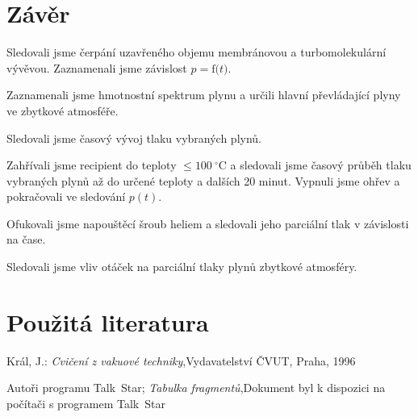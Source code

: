 \documentclass[english]{article}
\newcommand{\unit}[1]{~\mathrm{#1}}
\newcommand{\degc}{^\circ C}
\begin{document}
\section{Závěr}
	Sledovali jsme čerpání uzavřeného objemu membránovou a turbomolekulární vývěvou. Zaznamenali jsme závislost $p = \mathrm{f(}t\mathrm{)}$. 
	
	Zaznamenali jsme hmotnostní spektrum plynu a určili hlavní převládající plyny ve zbytkové atmosféře.
	
	Sledovali jsme časový vývoj tlaku vybraných plynů.
	
	Zahřívali jsme recipient do teploty $\leq 100\unit{\degc}$ a sledovali jsme časový průběh tlaku vybraných plynů až do určené teploty a dalších 20 minut. Vypnuli jsme ohřev a pokračovali ve sledování $p(t)$.
	
	Ofukovali jsme napouštěcí šroub heliem a sledovali jeho parciální tlak v závislosti na čase.
	
	Sledovali jsme vliv otáček na parciální tlaky plynů zbytkové atmosféry.
	
	
\section {Použitá literatura}
\begingroup
\renewcommand{\section}[2]{}

\begin{thebibliography}{9}


Král, J.: \emph{Cvičení z vakuové techniky},\newline Vydavatelství ČVUT, Praha, 1996

Autoři programu Talk~Star; \emph{Tabulka fragmentů},\newline Dokument byl k dispozici na počítači s programem Talk~Star 



\end{thebibliography}
\endgroup
\setcounter{equation}{0}
\end{document}

